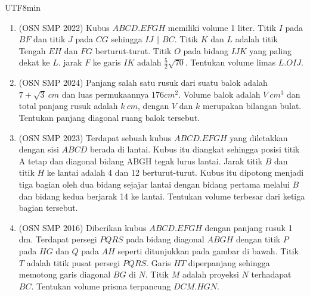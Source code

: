 \documentclass[12pt]{scrartcl}
\begin{document}
\begin{CJK*}{UTF8}{min}
\begin{enumerate}
\begin{center}
    \end{center}

    \item (OSN SMP 2022) Kubus $ABCD.EFGH$ memiliki volume 1 liter. Titik $I$ pada $BF$ dan titik $J$ pada $CG$ sehingga $IJ \parallel BC$. Titik $K$ dan $L$ adalah titik Tengah $EH$ dan $FG$ berturut-turut. Titik $O$ pada bidang $IJK$ yang paling dekat ke $L$. jarak $F$ ke garis $IK$ adalah $\frac{5}{2}\sqrt{70}$. Tentukan volume limas $L.OIJ$.

    \item (OSN SMP 2024) Panjang salah satu rusuk dari suatu balok adalah $7 + \sqrt{3}~cm$ dan luas permukaannya $176 cm^2$. Volume balok adalah $V~cm^3$ dan total panjang rusuk adalah $k~cm$, dengan $V$ dan $k$ merupakan bilangan bulat. Tentukan panjang diagonal ruang balok tersebut.

    \item (OSN SMP 2023) Terdapat sebuah kubus $ABCD.EFGH$ yang diletakkan dengan sisi $ABCD$ berada di lantai. Kubus itu diangkat sehingga posisi titik A tetap dan diagonal bidang ABGH tegak lurus lantai. Jarak titik $B$ dan titik $H$ ke lantai adalah 4 dan 12 berturut-turut. Kubus itu dipotong menjadi tiga bagian oleh dua bidang sejajar lantai dengan bidang pertama melalui $B$ dan bidang kedua berjarak 14 ke lantai. Tentukan volume terbesar dari ketiga bagian tersebut.

    \item (OSN SMP 2016) Diberikan kubus $ABCD.EFGH$ dengan panjang rusuk 1 dm. Terdapat persegi $PQRS$ pada bidang diagonal $ABGH$ dengan titik $P$ pada $HG$ dan $Q$ pada $AH$ seperti ditunjukkan pada gambar di bawah. Titik $T$ adalah titik pusat persegi $PQRS$. Garis $HT$ diperpanjang sehingga memotong garis diagonal $BG$ di $N$. Titik $M$ adalah proyeksi $N$ terhadapat $BC$. Tentukan volume prisma terpancung $DCM.HGN$.
    \begin{center}
\end{center}
\end{enumerate}
\end{CJK*}
\end{document}
